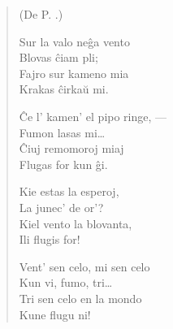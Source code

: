 \begin{verse}
\begin{center}
\footnotesize (De P. .)
\end{center}
                        Sur la valo ne\^ga vento\\
                        \vin  Blovas \^ciam pli;\\
                        Fajro sur kameno mia\\
                        \vin  Krakas \^cirka\u u mi.

                        \^Ce l' kamen' el pipo ringe, ---\\
                        \vin  Fumon lasas mi\dots\\
                        \^Ciuj remomoroj miaj\\
                        \vin  Flugas for kun \^gi.

                        Kie estas la esperoj,\\
                       \vin   La junec' de or'?\\
                        Kiel vento la blovanta,\\
                        \vin  Ili flugis for!

                        Vent' sen celo, mi sen celo\\
                        \vin  Kun vi, fumo, tri\dots\\
                        Tri sen celo en la mondo\\
                        \vin  Kune flugu ni!

\end{verse}


\smallrule{}

